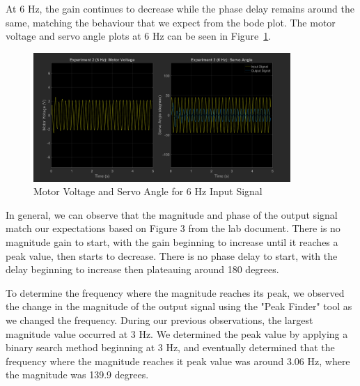 \documentclass[12pt]{article}
\begin{document}
At 6 Hz, the gain continues to decrease while the phase delay remains around the same, matching the behaviour that we expect from the bode plot. The motor voltage and servo angle plots at 6 Hz can be seen in Figure~\ref{fig:exp2_6}.
\begin{figure}[h!]
    \centering
    \includegraphics[width=0.87\textwidth]{exp2_6}
    \caption{\label{fig:exp2_6}Motor Voltage and Servo Angle for 6 Hz Input Signal}
\end{figure}

In general, we can observe that the magnitude and phase of the output signal match our expectations based on Figure 3 from the lab document. There is no magnitude gain to start, with the gain beginning to increase until it reaches a peak value, then starts to decrease. There is no phase delay to start, with the delay beginning to increase then plateauing around 180 degrees.

To determine the frequency where the magnitude reaches its peak, we observed the change in the magnitude of the output signal using the "Peak Finder" tool as we changed the frequency. During our previous observations, the largest magnitude value occurred at 3 Hz. We determined the peak value by applying a binary search method beginning at 3 Hz, and eventually determined that the frequency where the magnitude reaches it peak value was around 3.06 Hz, where the magnitude was 139.9 degrees.
\end{document}
